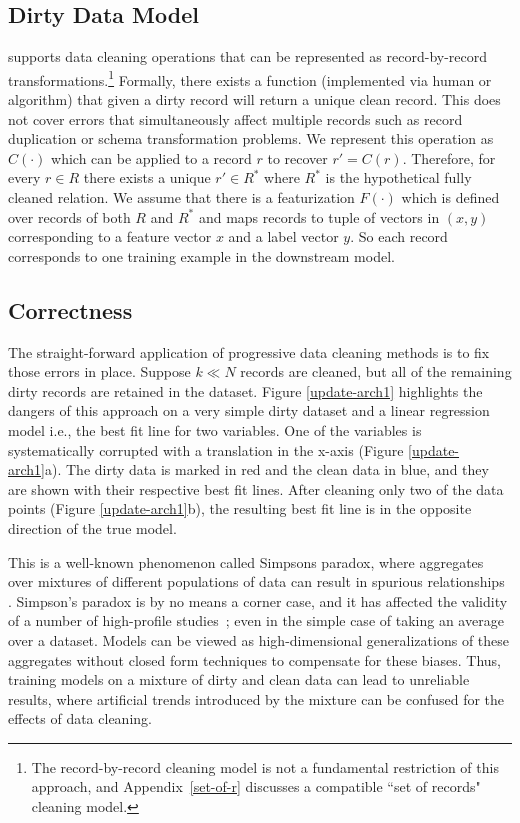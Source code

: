 \subsection{Dirty Data Model}\label{dmodel}
\sys supports data cleaning operations that can be represented as record-by-record transformations.\footnote{\small The record-by-record cleaning model is not a fundamental restriction of this approach, and Appendix~\ref{set-of-r} discusses a compatible ``set of records" cleaning model.}
Formally, there exists a function (implemented via human or algorithm) that given a dirty record will return a unique clean record.
This does not cover errors that simultaneously affect multiple records such as record duplication or schema transformation problems.
We represent this operation as $C(\cdot)$ which can be applied to a record $r$ to recover $r' = C(r)$.
Therefore, for every $r \in R$ there exists a unique $r' \in R^*$ where $R^*$ is the hypothetical fully cleaned relation.
We assume that there is a featurization $F(\cdot)$ which is defined over records of both $R$ and $R^*$ and maps records to tuple of vectors in $(x, y)$ corresponding to a feature vector $x$ and a label vector $y$.
So each record corresponds to one training example in the downstream model.

\subsection{Correctness}\label{correctness}  
The straight-forward application of progressive data cleaning methods is to fix those errors in place.
Suppose $k \ll N$ records are cleaned, but all of the remaining dirty records are retained in the dataset.
Figure \ref{update-arch1} highlights the dangers of this approach on a very simple dirty dataset and a linear regression model i.e., the best fit line for two variables. 
One of the variables is systematically corrupted with a translation in the x-axis (Figure \ref{update-arch1}a).
The dirty data is marked in red and the clean data in blue, and they are shown with their respective best fit lines.
After cleaning only two of the data points (Figure \ref{update-arch1}b), the resulting best fit line is in the opposite direction of the true model.

This is a well-known phenomenon called Simpsons paradox, where aggregates over mixtures of different populations of data can result in spurious relationships \cite{simpson1951interpretation}.
Simpson's paradox is by no means a corner case, and it has affected the validity of a number of high-profile studies~\cite{simpsonsparadox}; even in the simple case of taking an average over a dataset.
Models can be viewed as high-dimensional generalizations of these aggregates without closed form techniques to compensate for these biases.
Thus, training models on a mixture of dirty and clean data can lead to unreliable results, where artificial trends introduced by the mixture can be confused for the effects of data cleaning.

